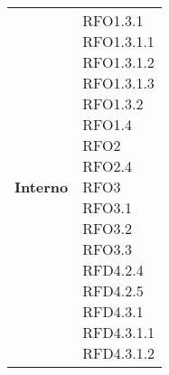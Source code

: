 \begin{longtable}[H]{| >{\centering\bfseries}p{8cm} | >{\centering\arraybackslash}p{8cm} |}
    Interno                          &
    \makecell{
        \rule{0pt}{4ex}
    RFO1.3.1                                                                                                     \\
    RFO1.3.1.1                                                                                                   \\
    RFO1.3.1.2                                                                                                   \\
    RFO1.3.1.3                                                                                                   \\
    RFO1.3.2                                                                                                     \\
    RFO1.4                                                                                                       \\
    RFO2                                                                                                         \\
    RFO2.4                                                                                                       \\
    RFO3                                                                                                         \\
    RFO3.1                                                                                                       \\
    RFO3.2                                                                                                       \\
    RFO3.3                                                                                                       \\
    RFD4.2.4                                                                                                     \\
    RFD4.2.5                                                                                                     \\
    RFD4.3.1                                                                                                     \\
    RFD4.3.1.1                                                                                                   \\
    RFD4.3.1.2                                                                                                   \\
}
\end{longtable}
